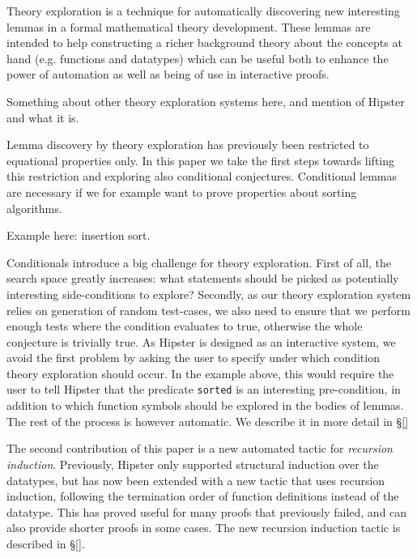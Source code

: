 \label{sec:intro}

Theory exploration is a technique for automatically discovering new interesting lemmas in a formal mathematical theory development. These lemmas are intended to help constructing a richer background theory about the concepts at hand (e.g. functions and datatypes) which can be useful both to enhance the power of automation as well as being of use in interactive proofs. 

Something about other theory exploration systems here, and mention of Hipster and what it is.

Lemma discovery by theory exploration has previously been restricted to equational properties only. In this paper we take the first steps towards lifting this restriction and exploring also conditional conjectures. Conditional lemmas are necessary if we for example want to prove properties about sorting algorithms.

Example here: insertion sort.

Conditionals introduce a big challenge for theory exploration. First of all, the search space greatly increases: what statements should be picked as potentially interesting side-conditions to explore? Secondly, as our theory exploration system relies on generation of random test-cases, we also need to ensure that we perform enough tests where the condition evaluates to true, otherwise the whole conjecture is trivially true. As Hipster is designed as an interactive system, we avoid the first problem by asking the user to specify under which condition theory exploration should occur. In the example above, this would require the user to tell Hipster that the predicate \texttt{sorted} is an interesting pre-condition, in addition to which function symbols should be explored in the bodies of lemmas. The rest of the process is however automatic. We describe it in more detail in \S \ref{} 

The second contribution of this paper is a new automated tactic for \emph{recursion induction}. Previously, Hipster only supported structural induction over the datatypes, but has now been extended with a new tactic that uses recursion induction, following the termination order of function definitions instead of the datatype. This has proved useful for many proofs that previously failed, and can also provide shorter proofs in some cases. The new recursion induction tactic is described in  \S \ref{}.

  